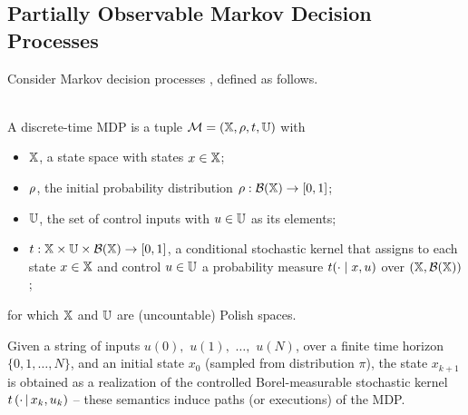 \documentclass{ifacconf}
\begin{document}
    

\subsection{Partially Observable Markov  Decision Processes}
Consider Markov decision processes \citep{Bertsekas2012,mt1993,hll1996}, defined as follows.%
\begin{definition}\label{def:MDP} \mbox{ }\\
  A discrete-time MDP is a tuple $\mathcal{M} = ({\mathbb{X}}, \rho, t, {\mathbb{U}})$ with
  \begin{itemize}
    \item ${\mathbb{X}}$,  a state space with states $x\in{\mathbb{X}}$; %
    \item $\rho$, the initial probability distribution $\rho:\mathcal{B}({\mathbb{X}})\rightarrow [0,1]$;
    \item ${\mathbb{U}}$, the set of control inputs with $u\in{\mathbb{U}}$ as its elements;
    \item $t:{\mathbb{X}}\times{\mathbb{U}}\times\mathcal B({\mathbb{X}})\rightarrow[0,1]$, a conditional stochastic kernel that assigns to each state $x\in {\mathbb{X}}$ and control $u\in {\mathbb{U}}$ a probability measure $t(\cdot\mid x,u)$ over $({\mathbb{X}},\mathcal B({\mathbb{X}}))$;
  \end{itemize}
  for which ${\mathbb{X}}$ and ${\mathbb{U}}$ are (uncountable) Polish spaces.
 \end{definition}
Given a string of inputs
$u(0),$ $u(1), $ $\ldots, $ $u(N)$,
over a finite time horizon $\{0,1,\ldots, N\}$,
and an initial state  $x_0$ (sampled from distribution $\pi$),
the state $x_{k+1}$
is obtained as a realization of the controlled Borel-measurable stochastic kernel $t\left(\cdot{\,\mid\,} x_k, u_k \right)$ --
these semantics induce paths (or executions) of the MDP.
 

 
\end{document}

